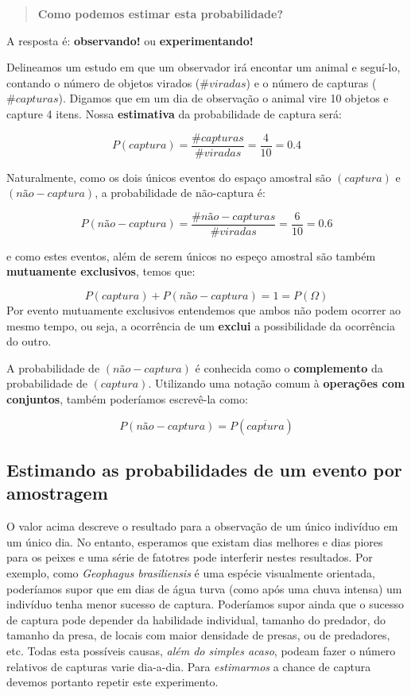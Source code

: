 \documentclass[
]{book}
\begin{document}
\begin{quote}
\textbf{Como podemos estimar esta probabilidade?}
\end{quote}

A resposta é: \textbf{observando!} ou \textbf{experimentando!}

Delineamos um estudo em que um observador irá encontar um animal e seguí-lo, contando o número de objetos virados (\(\#viradas\)) e o número de capturas (\(\#capturas\)). Digamos que em um dia de observação o animal vire 10 objetos e capture 4 itens. Nossa \textbf{estimativa} da probabilidade de captura será:

\[P(captura) = \frac{\#capturas}{\#viradas} = \frac{4}{10} = 0.4\]

Naturalmente, como os dois únicos eventos do espaço amostral são \((captura)\) e \((não-captura)\), a probabilidade de não-captura é:

\[P(não-captura) = \frac{\#não-capturas}{\#viradas} = \frac{6}{10} = 0.6\]

e como estes eventos, além de serem únicos no espeço amostral são também \textbf{mutuamente exclusivos}, temos que:

\[P(captura) + P(não-captura) = 1 = P(\Omega)\]
Por evento mutuamente exclusivos entendemos que ambos não podem ocorrer ao mesmo tempo, ou seja, a ocorrência de um \textbf{exclui} a possibilidade da ocorrência do outro.

A probabilidade de \((não-captura)\) é conhecida como o \textbf{complemento} da probabilidade de \((captura)\). Utilizando uma notação comum à \textbf{operações com conjuntos}, também poderíamos escrevê-la como:

\[P(não-captura) = P(\overline{captura})\]

\hypertarget{estimando-as-probabilidades-de-um-evento-por-amostragem}{%
\subsection{Estimando as probabilidades de um evento por amostragem}\label{estimando-as-probabilidades-de-um-evento-por-amostragem}}

O valor acima descreve o resultado para a observação de um único indivíduo em um único dia. No entanto, esperamos que existam dias melhores e dias piores para os peixes e uma série de fatotres pode interferir nestes resultados. Por exemplo, como \emph{Geophagus brasiliensis} é uma espécie visualmente orientada, poderíamos supor que em dias de água turva (como após uma chuva intensa) um indivíduo tenha menor sucesso de captura. Poderíamos supor ainda que o sucesso de captura pode depender da habilidade individual, tamanho do predador, do tamanho da presa, de locais com maior densidade de presas, ou de predadores, etc. Todas esta possíveis causas, \emph{além do simples acaso}, podeam fazer o número relativos de capturas varie dia-a-dia. Para \emph{estimarmos} a chance de captura devemos portanto repetir este experimento.
\end{document}
